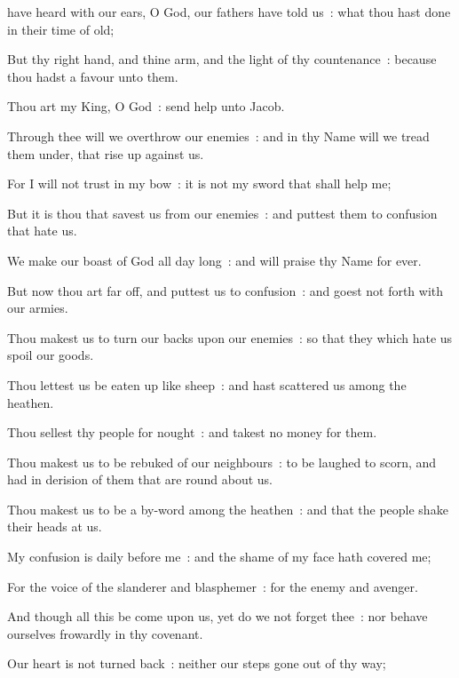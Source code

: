  have heard with our ears, O God, our fathers have told us~: what thou hast done in their time of old;\par
{}
But thy right hand, and thine arm, and the light of thy countenance~: because thou hadst a favour unto them.\par
{}Thou art my King, O God~: send help unto Jacob.\par
{}Through thee will we overthrow our enemies~: and in thy Name will we tread them under, that rise up against us.\par
{}For I will not trust in my bow~: it is not my sword that shall help me;\par
{}But it is thou that savest us from our enemies~: and puttest them to confusion that hate us.\par
{}We make our boast of God all day long~: and will praise thy Name for ever.\par
{}But now thou art far off, and puttest us to confusion~: and goest not forth with our armies.\par
{}Thou makest us to turn our backs upon our enemies~: so that they which hate us spoil our goods.\par
{}Thou lettest us be eaten up like sheep~: and hast scattered us among the heathen.\par
{}Thou sellest thy people for nought~: and takest no money for them.\par
{}Thou makest us to be rebuked of our neighbours~: to be laughed to scorn, and had in derision of them that are round about us.\par
{}Thou makest us to be a by-word among the heathen~: and that the people shake their heads at us.\par
{}My confusion is daily before me~: and the shame of my face hath covered me;\par
{}For the voice of the slanderer and blasphemer~: for the enemy and avenger.\par
{}And though all this be come upon us, yet do we not forget thee~: nor behave ourselves frowardly in thy covenant.\par
{}Our heart is not turned back~: neither our steps gone out of thy way;\par
